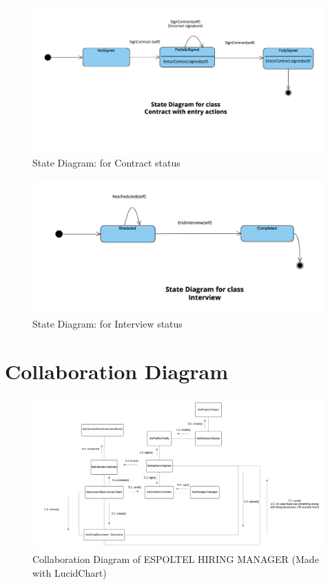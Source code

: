 \documentclass{scrreprt}
\begin{document}
\begin{figure}[H]
	\centering
	\includegraphics[width=\textwidth]{ST/ST2.png}
	\caption{State Diagram: for Contract status}
	\label{fig:ST2}
\end{figure}

\begin{figure}[H]
	\centering
	\includegraphics[width=\textwidth]{ST/ST3.png}
	\caption{State Diagram: for Interview status}
	\label{fig:ST3}
\end{figure}

\section{Collaboration Diagram}


\begin{figure}[H]
	\centering
	\includegraphics[width=18cm]{CollaborationDiagram.png}
	\caption{Collaboration Diagram of ESPOLTEL HIRING MANAGER (Made with LucidChart)}
	\label{fig:CD}
\end{figure}
\end{document}

